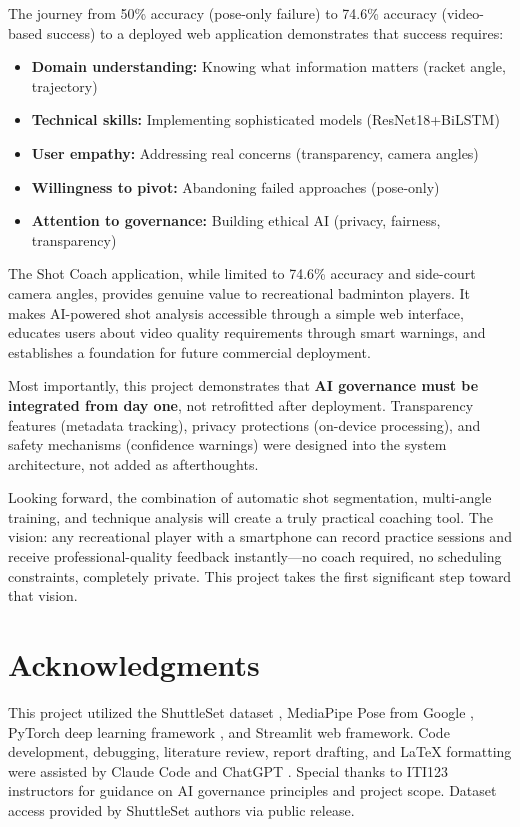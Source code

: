 \documentclass[11pt,a4paper]{article}
\begin{document}
The journey from 50\% accuracy (pose-only failure) to 74.6\% accuracy (video-based success) to a deployed web application demonstrates that success requires:

\begin{itemize}
\item \textbf{Domain understanding:} Knowing what information matters (racket angle, trajectory)
\item \textbf{Technical skills:} Implementing sophisticated models (ResNet18+BiLSTM)
\item \textbf{User empathy:} Addressing real concerns (transparency, camera angles)
\item \textbf{Willingness to pivot:} Abandoning failed approaches (pose-only)
\item \textbf{Attention to governance:} Building ethical AI (privacy, fairness, transparency)
\end{itemize}

The Shot Coach application, while limited to 74.6\% accuracy and side-court camera angles, provides genuine value to recreational badminton players. It makes AI-powered shot analysis accessible through a simple web interface, educates users about video quality requirements through smart warnings, and establishes a foundation for future commercial deployment.

Most importantly, this project demonstrates that \textbf{AI governance must be integrated from day one}, not retrofitted after deployment. Transparency features (metadata tracking), privacy protections (on-device processing), and safety mechanisms (confidence warnings) were designed into the system architecture, not added as afterthoughts.

Looking forward, the combination of automatic shot segmentation, multi-angle training, and technique analysis will create a truly practical coaching tool. The vision: any recreational player with a smartphone can record practice sessions and receive professional-quality feedback instantly---no coach required, no scheduling constraints, completely private. This project takes the first significant step toward that vision.

\section*{Acknowledgments}

This project utilized the ShuttleSet dataset \cite{ShuttleSet}, MediaPipe Pose from Google \cite{MediaPipe}, PyTorch deep learning framework \cite{PyTorch}, and Streamlit web framework. Code development, debugging, literature review, report drafting, and LaTeX formatting were assisted by Claude Code \cite{ClaudeCode} and ChatGPT \cite{ChatGPT}. Special thanks to ITI123 instructors for guidance on AI governance principles and project scope. Dataset access provided by ShuttleSet authors via public release.
\end{document}
